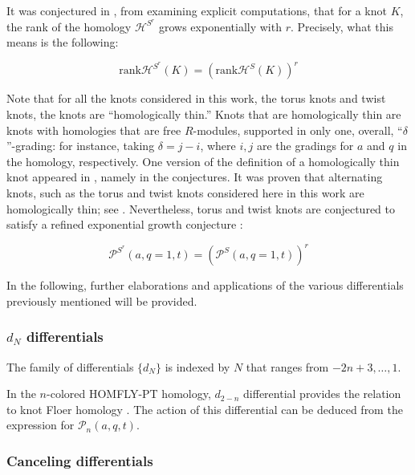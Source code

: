 \documentclass[a4paper,titlepage,twoside]{book}
\begin{document}
It was conjectured in \cite{GukovStosic2012}, from examining explicit computations, that for a knot $K$, the rank of the homology $\mathcal{H}^{S^r}$ grows exponentially with $r$.  Precisely, what this means is the following:



\begin{equation}
  \text{rank}{ \mathcal{H}^{S^r}{(K)} } = \left( \text{rank}{ \mathcal{H}^S{ (K) } } \right)^r
\end{equation}

Note that for all the knots considered in this work, the torus knots and twist knots, the knots are ``homologically thin.''  Knots that are homologically thin are knots with homologies that are free $R$-modules,  supported in only one, overall, ``$\delta$''-grading: for instance, taking $\delta = j-i$, where $i,j$ are the gradings for $a$ and $q$ in the homology, respectively.  One version of the definition of a homologically thin knot appeared in \cite{Bar-Natan2002}, namely in the conjectures.  It was proven that alternating knots, such as the torus and twist knots considered here in this work are homologically thin; see \cite{Lee2002}.  Nevertheless, torus and twist knots are conjectured to satisfy a refined exponential growth conjecture \cite{FujiGukovStosicSulkowski2013}:

\begin{equation}
  \mathcal{P}^{S^r}{(a,q=1,t) } = ( \mathcal{P}^{S}{ (a,q=1,t) }   )^r \label{Eq:refinedexponentialgrowth}
\end{equation}

In the following, further elaborations and applications of the various differentials previously mentioned will be provided.

\subsubsection{$d_N$ differentials}\label{subsubsec:differentialsfamily}

The family of differentials $\lbrace d_N \rbrace$ is indexed by $N$ that ranges from $-2n+3, \dots , 1$.  

In the $n$-colored HOMFLY-PT homology, $d_{2-n}$ differential provides the relation to knot Floer homology \cite{DunfieldGukovRasmussen2005}.  The action of this differential can be deduced from the expression for $\mathcal{P}_n{(a,q,t)}$.  

\subsubsection{Canceling differentials}
\end{document}
